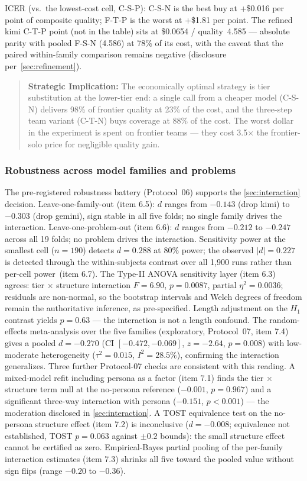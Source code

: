 \documentclass[12pt,a4paper]{article}
\begin{document}
ICER (vs.\ the lowest-cost cell, C-S-P): C-S-N is the best buy at +\$0.016 per
point of composite quality; F-T-P is the worst at +\$1.81 per point. The
refined kimi C-T-P point (not in the table) sits at \$0.0654 / quality~4.585 ---
absolute parity with pooled F-S-N (4.586) at 78\% of its cost, with the caveat
that the paired within-family comparison remains negative (disclosure
per~\cref{sec:refinement}).

\begin{quote}
\textbf{Strategic Implication:} The economically optimal strategy is tier
substitution at the lower-tier end: a single call from a cheaper model
(C-S-N) delivers 98\% of frontier quality at 23\% of the cost, and the
three-step team variant (C-T-N) buys coverage at 88\% of the cost. The worst
dollar in the experiment is spent on frontier teams --- they cost
3.5$\times$ the frontier-solo price for negligible quality gain.
\end{quote}

\subsubsection{Robustness across model families and problems}\label{sec:robustness-families}

The pre-registered robustness battery (Protocol~06) supports the
\cref{sec:interaction} decision.
Leave-one-family-out (item 6.5): $d$ ranges from $-0.143$ (drop kimi) to $-0.303$ (drop
gemini), sign stable in all five folds; no single family drives the
interaction. Leave-one-problem-out (item 6.6): $d$ ranges from $-0.212$ to $-0.247$ across
all 19 folds; no problem drives the interaction. Sensitivity power at the
smallest cell ($n = 190$) detects $d = 0.288$ at 80\% power; the observed $|d|
= 0.227$ is detected through the within-subjects contrast over all 1{,}900 runs
rather than per-cell power~(item 6.7). The Type-II ANOVA sensitivity layer (item 6.3)
agrees: tier $\times$ structure interaction $F = 6.90$, $p = 0.0087$, partial
$\eta^2 = 0.0036$; residuals are non-normal, so the bootstrap intervals and
Welch degrees of freedom remain the authoritative inference, as pre-specified.
Length adjustment on the $H_1$ contrast
yields $p = 0.63$ --- the interaction is not a length confound. The
random-effects meta-analysis over the five families (exploratory, Protocol~07,
item 7.4) gives a pooled $d =
-0.270$ (CI $[-0.472, -0.069]$, $z = -2.64$, $p = 0.008$) with low-moderate
heterogeneity ($\tau^2 = 0.015$, $I^2 = 28.5\%$), confirming the interaction
generalizes. Three further Protocol-07 checks are consistent with this
reading. A mixed-model refit including persona as a factor (item 7.1) finds
the tier $\times$ structure term null at the no-persona reference
($-0.001$, $p = 0.967$) and a significant three-way interaction with persona
($-0.151$, $p < 0.001$) --- the moderation disclosed in
\cref{sec:interaction}. A TOST equivalence test on the no-persona structure
effect (item 7.2) is inconclusive ($d = -0.008$; equivalence not established,
TOST $p = 0.063$ against $\pm 0.2$ bounds): the small structure effect cannot
be certified as zero. Empirical-Bayes partial pooling of the per-family
interaction estimates (item 7.3) shrinks all five toward the pooled value
without sign flips (range $-0.20$ to $-0.36$).
\end{document}
